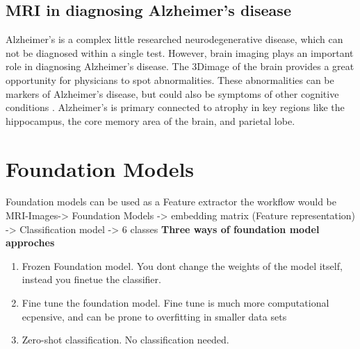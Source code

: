 \subsection{MRI in diagnosing Alzheimer's disease}
\label{sec:MRI in diagnosing Alzheimers disease}
Alzheimer's is a complex little researched neurodegenerative disease, which can not be diagnosed within a single test. However, brain imaging plays an important role in diagnosing Alzheimer's disease.
The 3Dimage of the brain provides a great opportunity for physicians to spot abnormalities. 
These abnormalities can be markers of Alzheimer's disease, but could also be symptoms of other cognitive conditions
\cite{Envision_Radiology}. Alzheimer's is primary connected to atrophy in key regions like the hippocampus, the core memory area of the brain, and parietal lobe. 

\section{Foundation Models}
\label{sec:Foundation MOdels}
 Foundation models can be used as a Feature extractor 
 the workflow would be MRI-Images-> Foundation Models -> embedding matrix (Feature representation) -> Classification model -> 6 classes
 \textbf{Three ways of foundation model approches}
 \begin{enumerate}
    \item Frozen Foundation model. You dont change the weights of the model itself, instead you finetue the classifier. 
    \item Fine tune the foundation model. Fine tune is much more computational ecpensive, and can be prone to overfitting in smaller data sets
    \item Zero-shot classification. No classification needed. 
 \end{enumerate}
